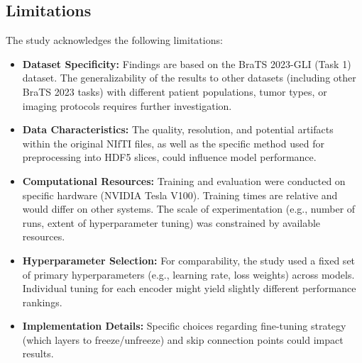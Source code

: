 \subsection{Limitations}
The study acknowledges the following limitations:
\begin{itemize}
  \item \textbf{Dataset Specificity:} Findings are based on the BraTS 2023-GLI (Task 1) dataset. The generalizability of the results to other datasets (including other BraTS 2023 tasks) with different patient populations, tumor types, or imaging protocols requires further investigation.
  \item \textbf{Data Characteristics:} The quality, resolution, and potential artifacts within the original NIfTI files, as well as the specific method used for preprocessing into HDF5 slices, could influence model performance.
  \item \textbf{Computational Resources:} Training and evaluation were conducted on specific hardware (NVIDIA Tesla V100). Training times are relative and would differ on other systems. The scale of experimentation (e.g., number of runs, extent of hyperparameter tuning) was constrained by available resources.
  \item \textbf{Hyperparameter Selection:} For comparability, the study used a fixed set of primary hyperparameters (e.g., learning rate, loss weights) across models. Individual tuning for each encoder might yield slightly different performance rankings.
  \item \textbf{Implementation Details:} Specific choices regarding fine-tuning strategy (which layers to freeze/unfreeze) and skip connection points could impact results.
\end{itemize}